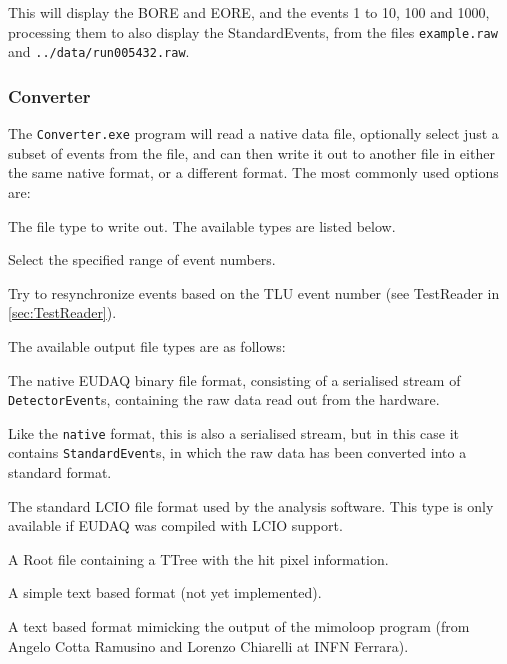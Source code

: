 This will display the \gls{BORE} and \gls{EORE}, and the events 1 to 10, 100 and 1000,
processing them to also display the StandardEvents,
from the files \texttt{example.raw} and \texttt{../data/run005432.raw}.

\subsubsection{Converter}
\label{sec:Converter}
The \texttt{Converter.exe} program will read a native data file,
optionally select just a subset of events from the file,
and can then write it out to another file in either the same native format, or a different format.
The most commonly used options are:
\begin{description}
The file type to write out.
The available types are listed below.

Select the specified range of event numbers.

Try to resynchronize events based on the TLU event number
(see TestReader in \autoref{sec:TestReader}).

\end{description}

The available output file types are as follows:

\begin{description}\label{lst:FileTypes}

The native EUDAQ binary file format, consisting of a serialised stream of
\texttt{DetectorEvent}s, containing the raw data read out from the hardware.

Like the \texttt{native} format, this is also a serialised stream,
but in this case it contains \texttt{StandardEvent}s,
in which the raw data has been converted into a standard format.

The standard \gls{LCIO} file format used by the analysis software.
This type is only available if EUDAQ was compiled with \gls{LCIO} support.

A Root file containing a TTree with the hit pixel information.

A simple text based format (not yet implemented).

A text based format mimicking the output of the mimoloop program
(from Angelo Cotta Ramusino and Lorenzo Chiarelli at INFN Ferrara).

\end{description}

